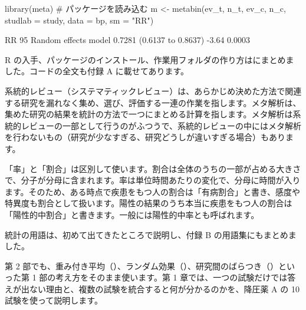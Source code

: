 \begin{rcode}
library(meta)            # パッケージを読み込む
m <- metabin(ev_t, n_t, ev_c, n_c,
             studlab = study, data = bp, sm = "RR")
\end{rcode}

\begin{rout}
                         RR             95%
Random effects model 0.7281 (0.6137 to 0.8637) -3.64   0.0003
\end{rout}

R の入手、パッケージのインストール、作業用フォルダの作り方はにまとめました。コードの全文も付録 A に載せてあります。


系統的レビュー（システマティックレビュー）は、あらかじめ決めた方法で関連する研究を漏れなく集め、選び、評価する一連の作業を指します。メタ解析は、集めた研究の結果を統計の方法で一つにまとめる計算を指します。メタ解析は系統的レビューの一部として行うのがふつうで、系統的レビューの中にはメタ解析を行わないもの（研究が少なすぎる、研究どうしが違いすぎる場合）もあります。

「率」と「割合」は区別して使います。割合は全体のうちの一部が占める大きさで、分子が分母に含まれます。率は単位時間あたりの変化で、分母に時間が入ります。そのため、ある時点で疾患をもつ人の割合は「有病割合」と書き、感度や特異度も割合として扱います。陽性の結果のうち本当に疾患をもつ人の割合は「陽性的中割合」と書きます。一般には陽性的中率とも呼ばれます。

統計の用語は、初めて出てきたところで説明し、付録 B の用語集にもまとめました。


第 2 部でも、重み付き平均（）、ランダム効果（）、研究間のばらつき（）といった第 1 部の考え方をそのまま使います。第 1 章では、一つの試験だけでは答えが出ない理由と、複数の試験を統合すると何が分かるのかを、降圧薬 A の 10 試験を使って説明します。
